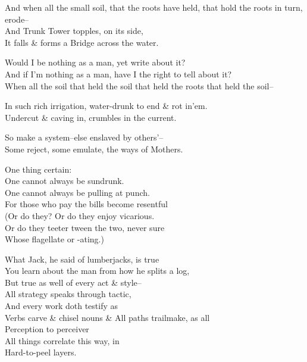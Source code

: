 And when all the small soil, that the roots have held, that hold the roots in turn, erode-- \\
And Trunk Tower topples, on its side, \\
It falls \& forms a Bridge across the water.

Would I be nothing as a man, yet write about it? \\
And if I'm nothing as a man, have I the right to tell about it? \\
When all the soil that held the soil that held the roots that held the soil--

In such rich irrigation, water-drunk to end \& rot in'em. \\
Undercut \& caving in, crumbles in the current.

So make a system--else enslaved by others'-- \\
Some reject, some emulate, the ways of Mothers.

One thing certain: \\ 
One cannot always be sundrunk. \\
One cannot always be pulling at punch. \\
For those who pay the bills become resentful \\
(Or do they? Or do they enjoy vicarious. \\
Or do they teeter tween the two, never sure \\
Whose flagellate or -ating.)

What Jack, he said of lumberjacks, is true \\
You learn about the man from how he splits a log, \\
But true as well of every act \& style-- \\
All strategy speaks through tactic, \\
And every work doth testify as \\
Verbs carve \& chisel nouns \&
All paths trailmake, as all \\
Perception to perceiver \\
All things correlate this way, in \\
Hard-to-peel layers.